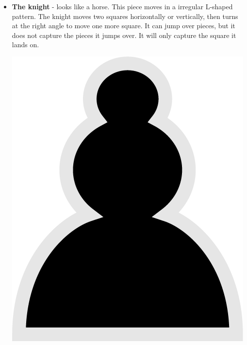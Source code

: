 \documentclass{article}
\begin{document}
\begin{itemize}
\begin{center}
    \end{center}
    \item \textbf{The knight} - looks like a horse. This piece moves in a irregular L-shaped pattern. The knight moves two squares horizontally or vertically, then turns at the right angle to move one more square. It can jump over pieces, but it does not capture the pieces it jumps over. It will only capture the square it lands on. \\
    
    \begin{center}
    	\includegraphics[scale=0.1]{image2.png}

\end{center}
\end{itemize}
\end{document}
